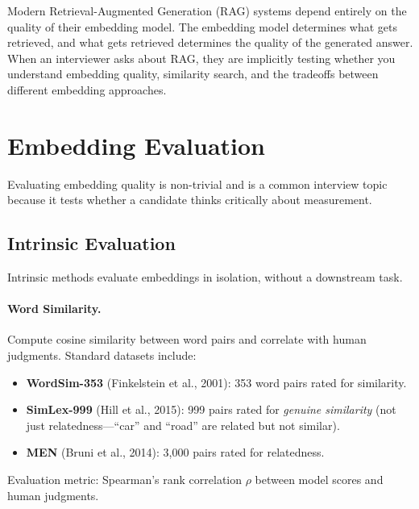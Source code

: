 \begin{keyinsight}
Modern Retrieval-Augmented Generation (RAG) systems depend entirely on the
quality of their embedding model.  The embedding model determines what gets
retrieved, and what gets retrieved determines the quality of the generated
answer.  When an interviewer asks about RAG, they are implicitly testing
whether you understand embedding quality, similarity search, and the
tradeoffs between different embedding approaches.
\end{keyinsight}


\section{Embedding Evaluation}
\label{sec:embedding_evaluation}

Evaluating embedding quality is non-trivial and is a common interview topic
because it tests whether a candidate thinks critically about measurement.

\subsection{Intrinsic Evaluation}

Intrinsic methods evaluate embeddings in isolation, without a downstream task.

\paragraph{Word Similarity.}
Compute cosine similarity between word pairs and correlate with human
judgments.  Standard datasets include:
\begin{itemize}
    \item \textbf{WordSim-353} (Finkelstein et al., 2001): 353 word pairs
    rated for similarity.
    \item \textbf{SimLex-999} (Hill et al., 2015): 999 pairs rated for
    \emph{genuine similarity} (not just relatedness---``car'' and ``road''
    are related but not similar).
    \item \textbf{MEN} (Bruni et al., 2014): 3,000 pairs rated for
    relatedness.
\end{itemize}
Evaluation metric: Spearman's rank correlation $\rho$ between model scores
and human judgments.


